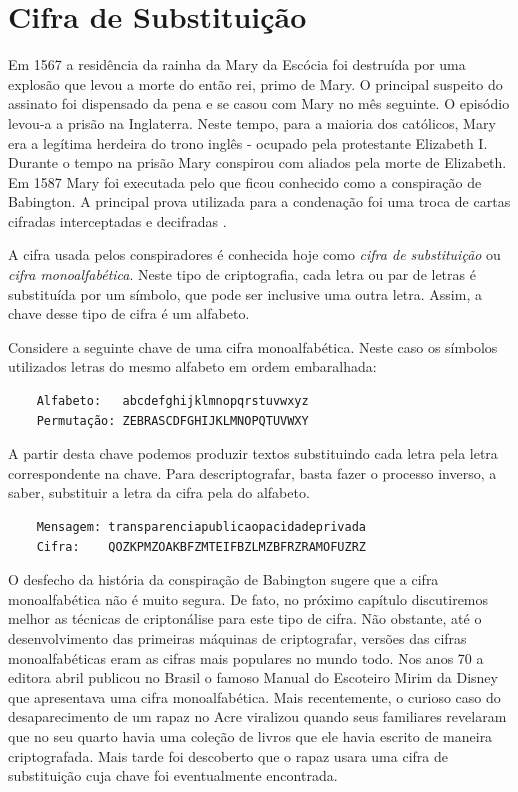\section{Cifra de Substituição}
\label{sec:cifra-monoalfabetica}

Em 1567 a residência da rainha da Mary da Escócia foi destruída por uma explosão que levou a morte do então rei, primo de Mary.
O principal suspeito do assinato foi dispensado da pena e se casou com Mary no mês seguinte.
O episódio levou-a a prisão na Inglaterra.
Neste tempo, para a maioria dos católicos, Mary era a legítima herdeira do trono inglês - ocupado pela protestante Elizabeth I.
Durante o tempo na prisão Mary conspirou com aliados pela morte de Elizabeth.
Em 1587 Mary foi executada pelo que ficou conhecido como a conspiração de Babington.
A principal prova utilizada para a condenação foi uma troca de cartas cifradas interceptadas e decifradas \cite{Singh04}.

A cifra usada pelos conspiradores é conhecida hoje como {\em cifra de substituição} ou {\em cifra monoalfabética}.
Neste tipo de criptografia, cada letra ou par de letras é substituída por um símbolo, que pode ser inclusive uma outra letra.
Assim, a chave desse tipo de cifra é um alfabeto.


\begin{example}
  Considere a seguinte chave de uma cifra monoalfabética.
  Neste caso os símbolos utilizados letras do mesmo alfabeto em ordem embaralhada:
  \begin{verbatim}
    Alfabeto:   abcdefghijklmnopqrstuvwxyz
    Permutação: ZEBRASCDFGHIJKLMNOPQTUVWXY
  \end{verbatim}

  A partir desta chave podemos produzir textos substituindo cada letra pela letra correspondente na chave.
  Para descriptografar, basta fazer o processo inverso, a saber, substituir a letra da cifra pela do alfabeto.

  \begin{verbatim}
    Mensagem: transparenciapublicaopacidadeprivada
    Cifra:    QOZKPMZOAKBFZMTEIFBZLMZBFRZRAMOFUZRZ
  \end{verbatim}
\end{example}

O desfecho da história da conspiração de Babington sugere que a cifra monoalfabética não é muito segura.
De fato, no próximo capítulo discutiremos melhor as técnicas de criptonálise para este tipo de cifra.
Não obstante, até o desenvolvimento das primeiras máquinas de criptografar, versões das cifras monoalfabéticas eram as cifras mais populares no mundo todo.
Nos anos 70 a editora abril publicou no Brasil o famoso Manual do Escoteiro Mirim da Disney que apresentava uma cifra monoalfabética.
Mais recentemente, o curioso caso do desaparecimento de um rapaz no Acre viralizou quando seus familiares revelaram que no seu quarto havia uma coleção de livros que ele havia escrito de maneira criptografada.
Mais tarde foi descoberto que o rapaz usara uma cifra de substituição cuja chave foi eventualmente encontrada.

